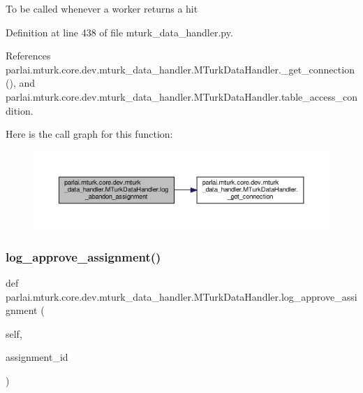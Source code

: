 \begin{DoxyVerb}To be called whenever a worker returns a hit\end{DoxyVerb}
 

Definition at line 438 of file mturk\+\_\+data\+\_\+handler.\+py.



References parlai.\+mturk.\+core.\+dev.\+mturk\+\_\+data\+\_\+handler.\+M\+Turk\+Data\+Handler.\+\_\+get\+\_\+connection(), and parlai.\+mturk.\+core.\+dev.\+mturk\+\_\+data\+\_\+handler.\+M\+Turk\+Data\+Handler.\+table\+\_\+access\+\_\+condition.

Here is the call graph for this function\+:
\nopagebreak
\begin{figure}[H]
\begin{center}
\leavevmode
\includegraphics[width=350pt]{classparlai_1_1mturk_1_1core_1_1dev_1_1mturk__data__handler_1_1MTurkDataHandler_a6f53c1208c4e3b71be96c4f3e96dab2e_cgraph}
\end{center}
\end{figure}
\mbox{\label{classparlai_1_1mturk_1_1core_1_1dev_1_1mturk__data__handler_1_1MTurkDataHandler_a57266a8380587e0256b966ad780ec7d7}} 
\subsubsection{\texorpdfstring{log\+\_\+approve\+\_\+assignment()}{log\_approve\_assignment()}}
{\footnotesize\ttfamily def parlai.\+mturk.\+core.\+dev.\+mturk\+\_\+data\+\_\+handler.\+M\+Turk\+Data\+Handler.\+log\+\_\+approve\+\_\+assignment (\begin{DoxyParamCaption}\item[{}]{self,  }\item[{}]{assignment\+\_\+id }\end{DoxyParamCaption})}


